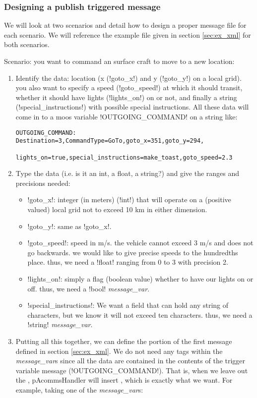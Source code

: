 \subsubsection{Designing a publish triggered message}  \label{sec:design}
We will look at two scenarios and detail how to design a proper message file for each scenario. We will reference the example file given in section \ref{sec:ex_xml} for both scenarios.

Scenario: you want to command an surface craft to move to a new location:
\begin{enumerate}
\item Identify the data: location (x (!goto_x!) and y (!goto_y!) on a local grid). you also want to specify a speed (!goto_speed!) at which it should transit, whether it should have lights (!lights_on!) on or not, and finally a string (!special_instructions!) with possible special instructions. All these data will come in to a moos variable !OUTGOING_COMMAND! on a string like: 
\begin{small}
\begin{verbatim}
OUTGOING_COMMAND: Destination=3,CommandType=GoTo,goto_x=351,goto_y=294,
                  lights_on=true,special_instructions=make_toast,goto_speed=2.3
\end{verbatim}
\end{small}
\item Type the data (i.e. is it an int, a float, a string?) and give the ranges and precisions needed: 
\begin{itemize}
\item !goto_x!: integer (in meters) (!int!) that will operate on a (positive valued) local grid not to exceed 10 km in either dimension. 
\item !goto_y!: same as !goto_x!.
\item !goto_speed!: speed in m/s. the vehicle cannot exceed 3 m/s and does not go backwards. we would like to give precise speeds to the hundredths place. thus, we need a !float! ranging from 0 to 3 with precision 2.
\item !lights_on!: simply a flag (boolean value) whether to have our lights on or off. thus, we need a !bool! \textit{message\_var}.
\item !special_instructions!: We want a field that can hold any string of characters, but we know it will not exceed ten characters. thus, we need a !string! \textit{message\_var}.
\end{itemize}
\item Putting all this together, we can define the  portion of the first message defined in section \ref{sec:ex_xml}. We do not need any  tags within the \textit{message\_var}s since all the data are contained in the contents of the trigger variable message (!OUTGOING_COMMAND!). That is, when we leave out the , pAcommsHandler will insert , which is exactly what we want. For example, taking one of the \textit{message\_var}s:

\end{enumerate}
